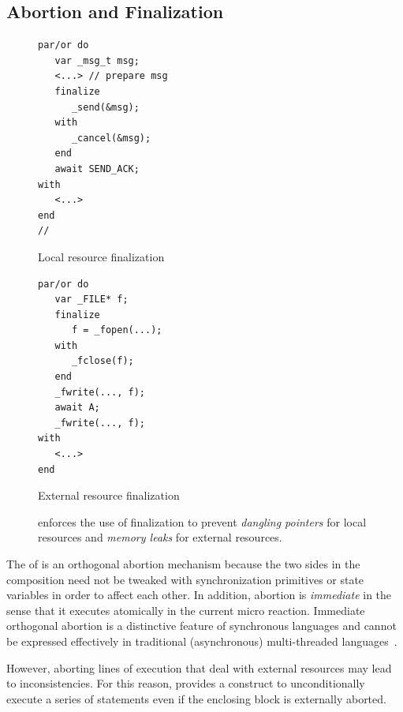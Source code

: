 \subsection{Abortion and Finalization}
\label{sec.ceu.fin}

\begin{figure}
\begin{minipage}[t]{0.45\linewidth}
\begin{lstlisting}[numbers=right]
par/or do
   var _msg_t msg;
   <...> // prepare msg
   finalize
      _send(&msg);
   with
      _cancel(&msg);
   end
   await SEND_ACK;
with
   <...>
end
//
\end{lstlisting}
\centering\small{\ax Local resource finalization}
\end{minipage}
%
\begin{minipage}[t]{0.53\linewidth}
\begin{lstlisting}[xleftmargin=2em]
par/or do
   var _FILE* f;
   finalize
      f = _fopen(...);
   with
      _fclose(f);
   end
   _fwrite(..., f);
   await A;
   _fwrite(..., f);
with
   <...>
end
\end{lstlisting}
\centering\small{\bx External resource finalization}
\end{minipage}
\caption{
\CEU enforces the use of finalization to prevent \emph{dangling pointers} for
local resources and \emph{memory leaks} for external resources.
\label{lst.fin.ceu}
}
\end{figure}

The  of \CEU is an orthogonal abortion mechanism because the two
sides in the composition need not be tweaked with synchronization primitives or
state variables in order to affect each other.
%
In addition, abortion is \emph{immediate} in the sense that it executes
atomically in the current micro reaction.
%
Immediate orthogonal abortion is a distinctive feature of synchronous languages
and cannot be expressed effectively in traditional (asynchronous)
multi-threaded languages~\cite{esterel.preemption,sync_async.threadsstop}.

However, aborting lines of execution that deal with external resources may lead
to inconsistencies.
%
For this reason, \CEU provides a  construct to unconditionally
execute a series of statements even if the enclosing block is externally
aborted.

